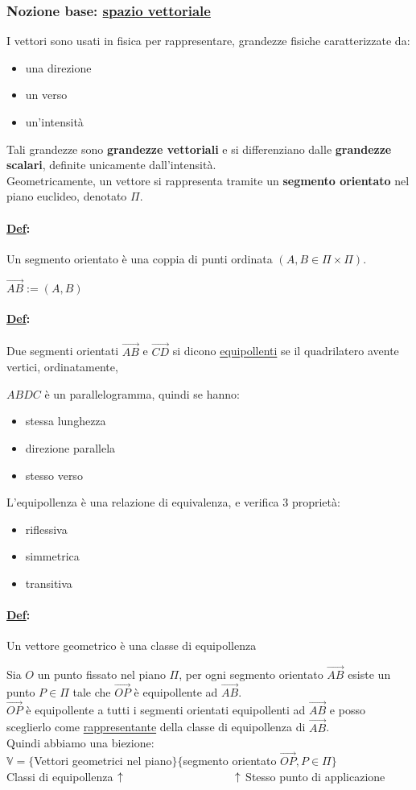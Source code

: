 \documentclass{article}
\newcommand{\ul}[1]{\underline{#1}}
\newcommand{\V}{\mathbb{V}}
\newcommand{\Def}[2]{\paragraph{\ul{Def}:}#1\\\hspace*{3em}\begin{minipage}{.8\textwidth}#2\end{minipage}}
\begin{document}
\subsubsection*{Nozione base: \ul{spazio vettoriale}}

I vettori sono usati in fisica per rappresentare, grandezze fisiche caratterizzate da:
\begin{itemize}
	\item una direzione
	\item un verso
	\item un'intensità
\end{itemize}
Tali grandezze sono \textbf{grandezze vettoriali} e si differenziano dalle \textbf{grandezze scalari}, definite unicamente dall'intensità.\\
Geometricamente, un vettore si rappresenta tramite un \textbf{segmento orientato} nel piano euclideo, denotato $\Pi$.
\Def{Un segmento orientato è una coppia di punti ordinata $(A,B\in\Pi\times\Pi)$.}{$\vec{AB}:=(A,B)$}
\Def{Due segmenti orientati $\vec{AB}$ e $\vec{CD}$ si dicono \ul{equipollenti} se il quadrilatero avente vertici, ordinatamente,}{$ABDC$ è un parallelogramma, quindi se hanno:
	\begin{itemize}
		\item stessa lunghezza
		\item direzione parallela
		\item stesso verso
\end{itemize}}

\vspace*{2em}
L'equipollenza è una relazione di equivalenza, e verifica 3 proprietà:
\begin{itemize}
	\item riflessiva
	\item simmetrica
	\item transitiva
\end{itemize}
\Def{Un vettore geometrico è una classe di equipollenza}
{Sia $O$ un punto fissato nel piano $\Pi$, per ogni segmento orientato $\vec{AB}$ esiste un punto $P\in\Pi$ tale che $\vec{OP}$ è equipollente ad $\vec{AB}$.\\
	$\vec{OP}$ è equipollente a tutti i segmenti orientati equipollenti ad $\vec{AB}$ e posso sceglierlo come \ul{rappresentante} della classe di equipollenza di $\vec{AB}$.\\
	Quindi abbiamo una biezione:\\
	$\V=\{$Vettori geometrici nel piano$\}\{$segmento orientato $\vec{OP},P\in\Pi\}$\\
Classi di equipollenza $\uparrow\hspace*{10em}\uparrow$ Stesso punto di applicazione}
\end{document}
